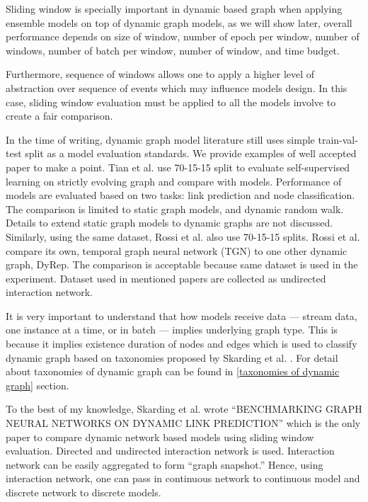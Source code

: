 \documentclass{IEEEtran}
\begin{document}
Sliding window is specially important in dynamic based graph when applying ensemble models on top of dynamic graph models, as we will show later, overall performance depends on size of window, number of epoch per window, number of windows, number of batch per window, number of window, and time budget.

Furthermore, sequence of windows allows one to apply a higher level of abstraction over sequence of events which may influence models design. In this case, sliding window evaluation must be applied to all the models involve to create a fair comparison.

In the time of writing, dynamic graph model literature still uses simple train-val-test split as a model evaluation standards. We provide examples of well accepted paper to make a point. Tian et al. \cite{tian2021self} use 70-15-15 split to evaluate self-supervised learning on strictly evolving graph and compare with models. Performance of models are evaluated based on two tasks: link prediction and node classification. The comparison is limited to static graph models, and dynamic random walk. Details to extend static graph models to dynamic graphs are not discussed. Similarly, using the same dataset, Rossi et al. \cite{rossi2020temporal} also use 70-15-15 splits. Rossi et al. compare its own, temporal graph neural network (TGN) to one other dynamic graph, DyRep. The comparison is acceptable because same dataset is used in the experiment. Dataset used in mentioned papers are collected as undirected interaction network.

It is very important to understand that how models receive data --- stream data, one instance at a time, or in batch --- implies underlying graph type. This is because it implies existence duration of nodes and edges which is used to classify dynamic graph based on taxonomies proposed by Skarding et al. \cite{skardingFoundationsModelingDynamic2021}. For detail about taxonomies of dynamic graph can be found in \ref{taxonomies of dynamic graph} section.

To the best of my knowledge, Skarding et al. wrote ``BENCHMARKING GRAPH NEURAL NETWORKS ON DYNAMIC LINK PREDICTION'' \cite{skarding2021benchmarking} which is the only paper to compare dynamic network based models using sliding window evaluation. Directed and undirected interaction network is used. Interaction network can be easily aggregated to form ``graph snapshot.'' Hence, using interaction network, one can pass in continuous network to continuous model and discrete network to discrete models.
\end{document}
